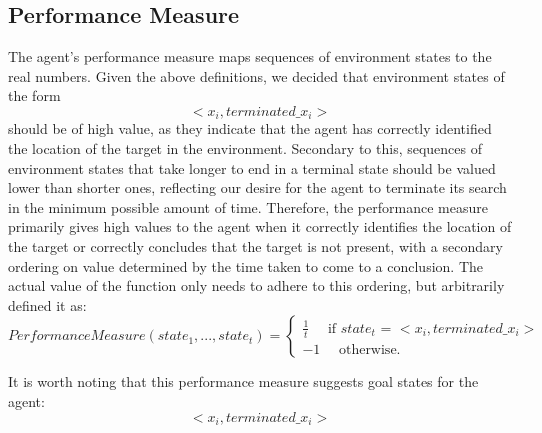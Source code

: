 \subsection{Performance Measure}\label{sssection:PerfMeas}
The agent's performance measure maps sequences of environment states to the real numbers. Given the above definitions, we decided that environment states of the form
\[ <x_i, terminated\_x_i> \]
should be of high value, as they indicate that the agent has correctly identified the location of the target in the environment. Secondary to this, sequences of environment states that take longer to end in a terminal state should be valued lower than shorter ones, reflecting our desire for the agent to terminate its search in the minimum possible amount of time. Therefore, the performance measure primarily gives high values to the agent when it correctly identifies the location of the target or correctly concludes that the target is not present, with a secondary ordering on value determined by the time taken to come to a conclusion. The actual value of the function only needs to adhere to this ordering, but arbitrarily defined it as:
\[
Performance Measure(state_1,..., state_t) = 
\begin{cases}
\frac{1}{t} \quad \text{ if } state_t \text{ = } <x_i, terminated\_x_i>
\\
-1 \quad \text { otherwise. }
\end{cases}
\]


It is worth noting that this performance measure suggests goal states for the agent:
\[ <x_i, terminated\_x_i> \]